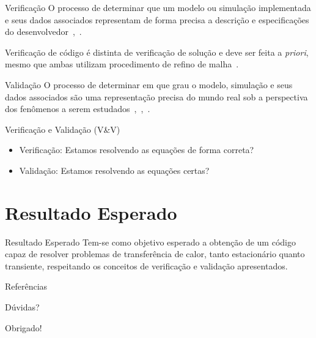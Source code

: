 \documentclass[14pt, aspectratio=169]{beamer}
\begin{document}
\begin{frame}{Verificação}
    \justifying
     O processo de determinar que um modelo ou simulação implementada e
    seus dados associados representam de forma precisa a descrição e especificações do
    desenvolvedor~\cite{dodi5000.61},~\cite{aiaa1998}.

    Verificação de código é distinta de verificação de solução e deve ser feita a
    \textit{priori}, mesmo que ambas utilizam procedimento de refino de
    malha~\cite{asme2009}.
\end{frame}

\begin{frame}{Validação}
    \justifying
     O processo de determinar em que grau o modelo, simulação e seus dados
     associados são uma representação precisa do mundo real sob a perspectiva
     dos fenômenos a serem
     estudados~\cite{aiaa1998},~\cite{dodi5000.61},~\cite{nasa7009a}.
\end{frame}

\begin{frame}{Verificação e Validação (V\&V)}
    \begin{itemize}
         \item Verificação: Estamos resolvendo as equações de forma correta? 
         \item Validação: Estamos resolvendo as equações certas?
    \end{itemize}
\end{frame}

\section{Resultado Esperado}

\begin{frame}{Resultado Esperado}
    \justifying
    Tem-se como objetivo esperado a obtenção de um código capaz de resolver
    problemas de transferência de calor, tanto estacionário quanto transiente,
    respeitando os conceitos de verificação e validação apresentados. 
\end{frame}

\begin{frame}[allowframebreaks]{Referências}
    
\end{frame}

\begin{frame}[standout]
Dúvidas?
\end{frame}

\begin{frame}[standout]
Obrigado!
\end{frame}
\end{document}
